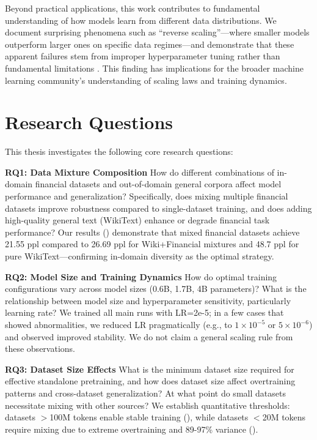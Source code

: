 Beyond practical applications, this work contributes to fundamental understanding of how models learn from different data distributions. We document surprising phenomena such as ``reverse scaling''—where smaller models outperform larger ones on specific data regimes—and demonstrate that these apparent failures stem from improper hyperparameter tuning rather than fundamental limitations \parencite{kaplan2020scaling,hoffmann2022training,mccandlish2018empirical}. This finding has implications for the broader machine learning community's understanding of scaling laws and training dynamics.

\section{Research Questions}

This thesis investigates the following core research questions:

\textbf{RQ1: Data Mixture Composition}
How do different combinations of in-domain financial datasets and out-of-domain general corpora affect model performance and generalization? Specifically, does mixing multiple financial datasets improve robustness compared to single-dataset training, and does adding high-quality general text (WikiText) enhance or degrade financial task performance? Our results () demonstrate that mixed financial datasets achieve 21.55 ppl compared to 26.69 ppl for Wiki+Financial mixtures and 48.7 ppl for pure WikiText—confirming in-domain diversity as the optimal strategy.

\textbf{RQ2: Model Size and Training Dynamics}
How do optimal training configurations vary across model sizes (0.6B, 1.7B, 4B parameters)? What is the relationship between model size and hyperparameter sensitivity, particularly learning rate? We trained all main runs with LR=2e-5; in a few cases that showed abnormalities, we reduced LR pragmatically (e.g., to $1\times10^{-5}$ or $5\times10^{-6}$) and observed improved stability. We do not claim a general scaling rule from these observations.

\textbf{RQ3: Dataset Size Effects}
What is the minimum dataset size required for effective standalone pretraining, and how does dataset size affect overtraining patterns and cross-dataset generalization? At what point do small datasets necessitate mixing with other sources? We establish quantitative thresholds: datasets $>$100M tokens enable stable training (), while datasets $<$20M tokens require mixing due to extreme overtraining and 89-97\% variance ().

